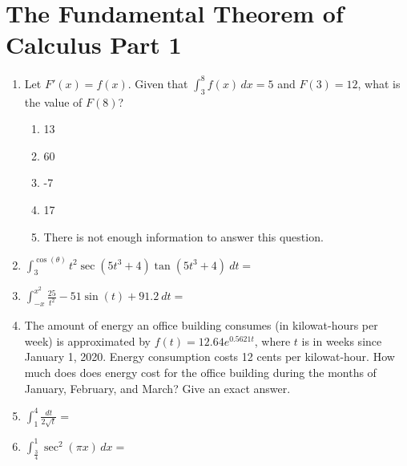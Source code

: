 \documentclass[12pt]{report}
\begin{document}
\newcommand{\less}{\textless}
\newcommand{\greater}{\textgreater}
\newcommand{\reals}{\mathbb{R}}
\newcommand{\integers}{\mathbb{Z}}
\newcommand{\rationals}{\mathbb{Q}}
\newcommand{\dsp}{\displaystyle}



\section*{The Fundamental Theorem of Calculus Part 1}

\begin{enumerate}


\item Let $F'(x)=f(x)$. Given that $\int_3^8 f(x)\,dx = 5$ and $F(3) = 12$, what is the value of $F(8)$?

\begin{enumerate}

\item 13

\item 60

\item -7

\item 17

\item There is not enough information to answer this question. 

\end{enumerate}

\item $\displaystyle \int_3^{\cos(\theta)}t^2\sec(5t^3+4)\tan(5t^3+4)\ dt =$

\item $\displaystyle \int_{-x}^{x^2} \frac{25}{t^2}-51\sin(t)+91.2\ dt =$

\item The amount of energy an office building consumes (in kilowat-hours per week) is approximated by $f(t) = 12.64e^{0.5621t}$, where $t$ is in weeks since January 1, 2020. Energy consumption costs 12 cents per kilowat-hour. How much does does energy cost for the office building during the months of January, February, and March?  Give an exact answer.

\item $\dsp \int_1^4 \frac{dt}{2\sqrt{t}} =$

\item $\dsp \int_{\frac{3}{4}}^1 \sec^2(\pi x)\,dx =$


\end{enumerate}
\end{document}
